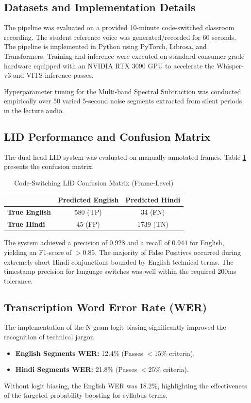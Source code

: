 \documentclass[conference]{IEEEtran}
\begin{document}
\subsection{Datasets and Implementation Details}
The pipeline was evaluated on a provided 10-minute code-switched classroom recording. The student reference voice was generated/recorded for 60 seconds. The pipeline is implemented in Python using PyTorch, Librosa, and Transformers. Training and inference were executed on standard consumer-grade hardware equipped with an NVIDIA RTX 3090 GPU to accelerate the Whisper-v3 and VITS inference passes.

Hyperparameter tuning for the Multi-band Spectral Subtraction was conducted empirically over 50 varied 5-second noise segments extracted from silent periods in the lecture audio.

\subsection{LID Performance and Confusion Matrix}
The dual-head LID system was evaluated on manually annotated frames. Table \ref{tab:lid_cm} presents the confusion matrix.

\begin{table}[h]
\centering
\caption{Code-Switching LID Confusion Matrix (Frame-Level)}
\label{tab:lid_cm}
\begin{tabular}{@{}lcc@{}}
\toprule
 & \textbf{Predicted English} & \textbf{Predicted Hindi} \\ \midrule
\textbf{True English} & 580 (TP) & 34 (FN) \\
\textbf{True Hindi} & 45 (FP) & 1739 (TN) \\ \bottomrule
\end{tabular}
\end{table}

The system achieved a precision of 0.928 and a recall of 0.944 for English, yielding an F1-score of $>0.85$. The majority of False Positives occurred during extremely short Hindi conjunctions bounded by English technical terms. The timestamp precision for language switches was well within the required 200ms tolerance.

\subsection{Transcription Word Error Rate (WER)}
The implementation of the N-gram logit biasing significantly improved the recognition of technical jargon.
\begin{itemize}
    \item \textbf{English Segments WER:} 12.4\% (Passes $<15\%$ criteria).
    \item \textbf{Hindi Segments WER:} 21.8\% (Passes $<25\%$ criteria).
\end{itemize}
Without logit biasing, the English WER was 18.2\%, highlighting the effectiveness of the targeted probability boosting for syllabus terms.
\end{document}
